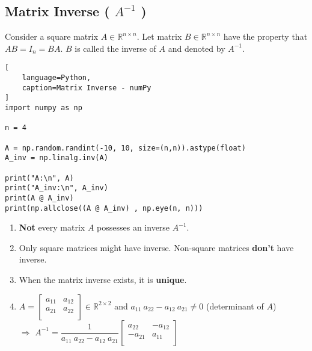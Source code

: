 \subsection{Matrix Inverse ( $A^{-1}$ ) \cite{mfml/book/mml/Deisenroth-Faisal-Ong}}

Consider a square matrix $A \in \mathbb{R}^{n\times n}$. Let matrix $B \in \mathbb{R}^{n\times n}$ have the property that $AB = I_n = BA$. $B$ is called the inverse of $A$ and denoted by $A^{-1}$.
\hfill \cite{mfml/book/mml/Deisenroth-Faisal-Ong}





\begin{lstlisting}[
    language=Python,
    caption=Matrix Inverse - numPy
]
import numpy as np

n = 4

A = np.random.randint(-10, 10, size=(n,n)).astype(float)
A_inv = np.linalg.inv(A)

print("A:\n", A)
print("A_inv:\n", A_inv)
print(A @ A_inv)
print(np.allclose((A @ A_inv) , np.eye(n, n)))
\end{lstlisting}






\begin{enumerate}
    \item \textbf{Not} every matrix $A$ possesses an inverse $A^{-1}$.
    \hfill \cite{mfml/book/mml/Deisenroth-Faisal-Ong}

    \item Only square matrices might have inverse. Non-square matrices \textbf{don't} have inverse.

    \item When the matrix inverse exists, it is \textbf{unique}.
    \hfill \cite{mfml/book/mml/Deisenroth-Faisal-Ong}

    \item $
        A = \begin{bmatrix}
            a_{11} & a_{12} \\
            a_{21} & a_{22} \\
        \end{bmatrix} 
        \in \mathbb{R}^{2\times 2}
    $
    \hspace{1cm} and \hspace{1cm}
    $a_{11}\ a_{22} - a_{12}\ a_{21} \neq 0$ (determinant of $A$)\\[0.4cm] 
    $\Rightarrow$
    $
        A^{-1} = 
        \dfrac{1}{a_{11}\ a_{22} - a_{12}\ a_{21}}
        \begin{bmatrix}
            a_{22} & -a_{12} \\
            -a_{21} & a_{11} \\
        \end{bmatrix}
    $
    \hfill \cite{mfml/book/mml/Deisenroth-Faisal-Ong}

\end{enumerate}



